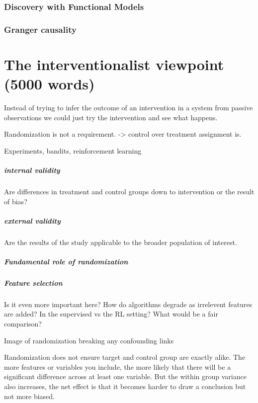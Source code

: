 \documentclass[11pt,a4paper,oneside]{book}
\begin{document}
\subsection*{Discovery with Functional Models}
\subsection*{Granger causality}

\chapter*{The interventionalist viewpoint (5000 words)}

Instead of trying to infer the outcome of an intervention in a system from passive observations we could just try the intervention and see what happens.

Randomization is not a requirement. -> control over treatment assignment is.

Experiments, bandits, reinforcement learning

\paragraph*{internal validity} Are differences in treatment and control groups down to intervention or the result of bias? 

\paragraph*{external validity} Are the results of the study applicable to the broader population of interest.

\paragraph*{Fundamental role of randomization}


\paragraph*{Feature selection} Is it even more important here? How do algorithms degrade as irrelevent features are added? In the supervised vs the RL setting? What would be a fair comparison?

Image of randomization breaking any confounding links

Randomization does not ensure target and control group are exactly alike. The more features or variables you include, the more likely that there will be a significant difference across at least one variable. But the within group variance also increases, the net effect is that it becomes harder to draw a conclusion but not more biased. 
\end{document}
